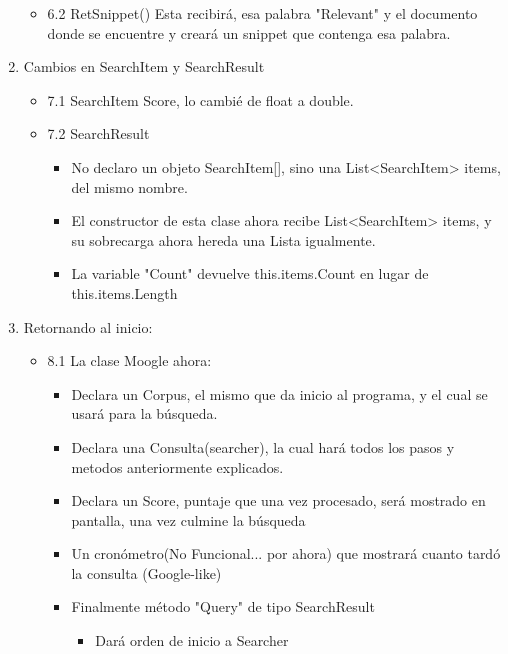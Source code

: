 \documentclass{article}
\begin{document}
\begin{enumerate}
\begin{itemize}
\begin{itemize}
            \end{itemize}
            \item 6.2 RetSnippet() Esta recibirá, esa palabra "Relevant" y el documento donde se encuentre y creará un snippet que contenga esa palabra.
        \end{itemize}
        \newpage
    \item Cambios en SearchItem y SearchResult
        \begin{itemize}
            \item 7.1 SearchItem Score, lo cambié de float a double.
            \item 7.2 SearchResult
            \begin{itemize}
                \item No declaro un objeto SearchItem[], sino una List<SearchItem> items, del mismo nombre.
                \item El constructor de esta clase ahora recibe List<SearchItem> items, y su sobrecarga ahora hereda una Lista igualmente.
                \item La variable "Count" devuelve this.items.Count en lugar de this.items.Length
            \end{itemize}
        \end{itemize}
        \newpage
    \item Retornando al inicio:
        \begin{itemize}
            \item 8.1 La clase Moogle ahora:
                \begin{itemize}
                    \item Declara un Corpus, el mismo que da inicio al programa, y el cual se usará para la búsqueda.
                    \item Declara una Consulta(searcher), la cual hará todos los pasos y metodos anteriormente explicados.
                    \item Declara un Score, puntaje que una vez procesado, será mostrado en pantalla, una vez culmine la búsqueda
                    \item Un cronómetro(No Funcional... por ahora) que mostrará cuanto tardó la consulta (Google-like)
                    \item Finalmente método "Query" de tipo SearchResult
                    \begin{itemize}
                        \item Dará orden de inicio a Searcher

\end{itemize}
\end{itemize}
\end{itemize}
\end{enumerate}
\end{document}
